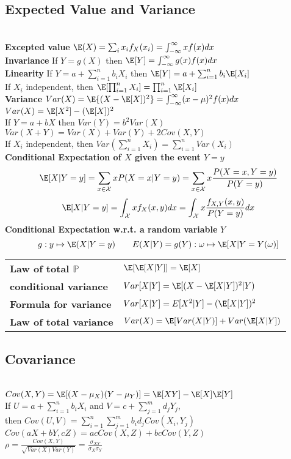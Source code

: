 \documentclass[8pt]{article}
\begin{document}
\begin{multicols}{3}
{  \subsection*{Expected Value and Variance}\\
  \textbf{Excepted value} $\E(X) = \sum_i x_i f_X(x_i) = \int_{-\infty}^{\infty} xf(x)dx$\\
  \textbf{Invariance} If $Y = g(X)$ then $\E[Y] = \int_{-\infty}^{\infty} g(x)f(x)dx$\\
  \textbf{Linearity} If $Y = a+\sum_{i=1}^n b_i X_i$ then $\E[Y] = a + \sum_{i=1}^n b_i \E[X_i]$\\
  If $X_i$ independent, then $\E[\prod_{i=1}^n X_i] = \prod_{i=1}^n \E[X_i]$\\
  \textbf{Variance} $Var(X) = \E\{ (X - \E[X])^2\} = \int_{-\infty}^{\infty} (x-\mu)^2 f(x)dx$\\
  $Var(X) = \E[X^2] - (\E[X])^2$\\
  If $Y = a+bX$ then $Var(Y) = b^2Var(X)$\\
  $Var(X+Y) = Var(X) + Var(Y) + 2Cov(X,Y)$\\
  If $X_i$ independent, then $Var(\sum_{i=1}^n X_i) = \sum_{i=1}^n Var(X_i)$\\
  \textbf{Conditional Expectation of $X$ given the event $Y=y$}
  \[
    \E[X|Y=y] = \sum_{x\in\mathcal{X}} xP(X=x | Y=y) =  \sum_{x\in\mathcal{X}} x\frac{P(X=x, Y=y)}{P(Y=y)}
  \]
  \[
    \E[X|Y=y] = \int_{\mathcal{X}} xf_X(x,y) dx =  \int_{\mathcal{X}} x \frac{f_{X,Y}(x,y)}{P(Y=y)} dx
  \]
  \textbf{Conditional Expectation w.r.t. a random variable} $Y$
  \[
    g: y \mapsto \E(X|Y=y) \quad \quad E(X|Y) = g(Y): \omega \mapsto \E[X|Y = Y(\omega)]
  \]
  \begin{tabular}{l l}
    \textbf{Law of total $\mathbb{P}$} & $\E[\E[X|Y]] = \E[X]$\\
    \textbf{conditional variance} & $Var[X|Y] = \E[(X-\E[X|Y])^2 | Y)$ \\
    \textbf{Formula for variance} & $Var[X|Y] = E[X^2 | Y] - (\E[X|Y])^2$\\
    \textbf{Law of total variance} & $Var(X) = \E[Var(X|Y)] + Var(\E[X|Y])$\\
  \end{tabular}


  \subsection*{Covariance}\\
  $Cov(X,Y) = \E[(X-\mu_X)(Y - \mu_Y)] = \E[XY] - \E[X]\E[Y]$\\
  If $U = a + \sum_{i=1}^n b_iX_i$ and $V=c + \sum_{j=1}^m d_j Y_j$, \\
  then $Cov(U,V) = \sum_{i=1}^n \sum_{j=1}^m b_i d_j Cov(X_i, Y_j)$\\
  $Cov(aX + bY, cZ) = acCov(X, Z) + bcCov(Y, Z)$\\
  $\rho = \frac{Cov(X,Y)}{\sqrt{Var(X)Var(Y)}} = \frac{\sigma_{XY}}{\sigma_X \sigma_Y}$\\

}
\end{multicols}
\end{document}

